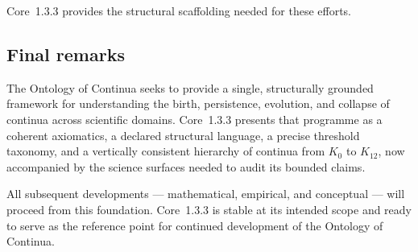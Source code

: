Core~1.3.3 provides the structural scaffolding needed for these efforts.

\subsection{Final remarks}

The Ontology of Continua seeks to provide a single, structurally grounded
framework for understanding the birth, persistence, evolution, and collapse of
continua across scientific domains. Core~1.3.3 presents that programme as a
coherent axiomatics, a declared structural language, a precise threshold
taxonomy, and a vertically consistent hierarchy of continua from \(K_0\) to
\(K_{12}\), now accompanied by the science surfaces needed to audit its bounded
claims.

All subsequent developments --- mathematical, empirical, and conceptual ---
will proceed from this foundation. Core~1.3.3 is stable at its intended scope and
ready to serve as the reference point for continued development of the
Ontology of Continua.
